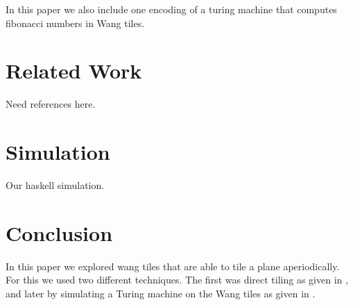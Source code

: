 \documentclass{article}
\begin{document}
In this paper we also include one encoding of a turing machine that computes fibonacci numbers in Wang tiles.

\section*{Related Work}
Need references here.

\section*{Simulation}
Our haskell simulation.

\section*{Conclusion}
In this paper we explored wang tiles that are able to tile a plane aperiodically. For this we used two different techniques. The first was direct tiling as given in \cite{tilings}, and later by simulating a Turing machine on the Wang tiles as given in \cite{tmtiles}.

\end{document}
